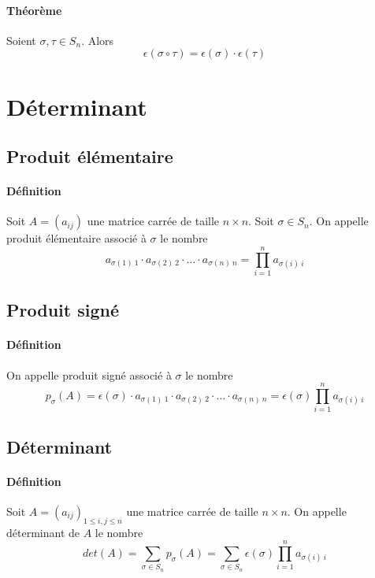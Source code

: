 \paragraph{Théorème} Soient $\sigma, \tau \in S_n$. Alors
$$\epsilon(\sigma \circ \tau) = \epsilon(\sigma) \cdot \epsilon(\tau)$$

%
%
\section{Déterminant}
%
%

%
\subsection{Produit élémentaire}
%
\paragraph{Définition} Soit $A = (a_{ij})$ une matrice carrée de taille $n\times n$. Soit $\sigma \in S_n$. On appelle produit élémentaire associé à $\sigma$ le nombre
$$a_{\sigma(1) ~ 1} \cdot a_{\sigma(2) ~ 2} \cdot \ldots \cdot a_{\sigma(n) ~ n} = \prod_{i=1}^{n} a_{\sigma(i) ~ i}$$
%
\subsection{Produit signé}
%
\paragraph{Définition} On appelle produit signé associé à $\sigma$ le nombre 
$$p_{\sigma}(A) = \epsilon(\sigma) \cdot a_{\sigma(1) ~ 1} \cdot a_{\sigma(2) ~ 2} \cdot \ldots \cdot a_{\sigma(n) ~ n} = \epsilon(\sigma) \prod_{i=1}^{n} a_{\sigma(i) ~ i}$$

%
\subsection{Déterminant}
\label{sec:determ}
%
\paragraph{Définition} Soit $A = (a_{ij})_{1 \leq i, j \leq n}$ une matrice carrée de taille $n \times n$. On appelle déterminant de $A$ le nombre
$$det(A) = \sum_{\sigma \in S_n} p_{\sigma}(A) = \sum_{\sigma \in S_n} \epsilon(\sigma) \prod_{i=1}^{n} a_{\sigma(i) ~ i}$$

